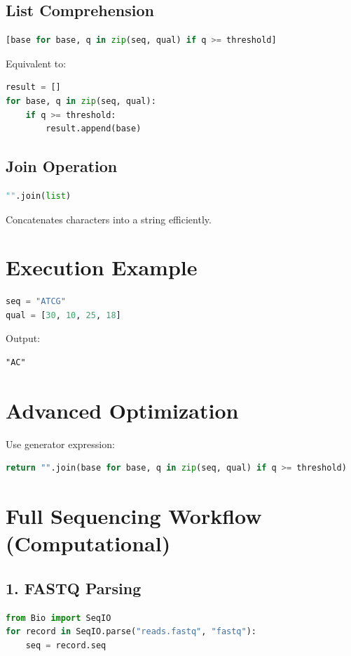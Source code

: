 \documentclass[12pt]{article}
\begin{document}
\subsection{List Comprehension}
\begin{lstlisting}[language=Python]
[base for base, q in zip(seq, qual) if q >= threshold]
\end{lstlisting}

Equivalent to:
\begin{lstlisting}[language=Python]
result = []
for base, q in zip(seq, qual):
    if q >= threshold:
        result.append(base)
\end{lstlisting}

\subsection{Join Operation}
\begin{lstlisting}[language=Python]
"".join(list)
\end{lstlisting}
Concatenates characters into a string efficiently.

\section{Execution Example}
\begin{lstlisting}[language=Python]
seq = "ATCG"
qual = [30, 10, 25, 18]
\end{lstlisting}

Output:
\begin{verbatim}
"AC"
\end{verbatim}

\section{Advanced Optimization}
Use generator expression:
\begin{lstlisting}[language=Python]
return "".join(base for base, q in zip(seq, qual) if q >= threshold)
\end{lstlisting}

\section{Full Sequencing Workflow (Computational)}

\subsection{1. FASTQ Parsing}
\begin{lstlisting}[language=Python]
from Bio import SeqIO
for record in SeqIO.parse("reads.fastq", "fastq"):
    seq = record.seq
\end{lstlisting}
\end{document}
